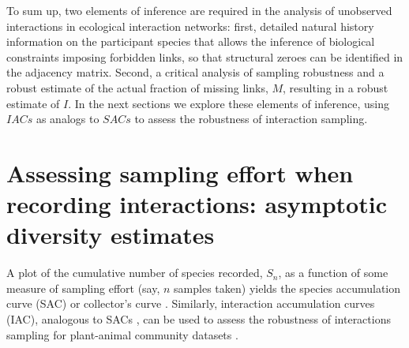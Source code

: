 \documentclass[12pt]{article}
\begin{document}

To sum up, two elements of inference are required in the analysis of unobserved interactions in ecological interaction networks: first, detailed natural history information on the participant species that allows the inference of biological constraints imposing forbidden links, so that structural zeroes can be identified in the adjacency matrix. Second, a critical analysis of sampling robustness and a robust estimate of the actual fraction of missing links, $M$, resulting in a robust estimate of $I$. In the next sections we explore these elements of inference, using $IACs$ as analogs to $SACs$ to assess the robustness of interaction sampling.

\section*{Assessing sampling effort when recording interactions: asymptotic diversity estimates}
\label{assessingsamplingeffortwhenrecordinginteractions}

A plot of the cumulative number of species recorded, $S_n$, as a function of some measure of sampling effort (say, $n$ samples taken) yields the species accumulation curve (SAC) or collector's curve \citep{Colwell:1994vt}. Similarly, interaction accumulation curves (IAC), analogous to SACs \citep{Gotelli:2001uo,Hortal:2006dc,Chao:2005wp,Colwell:2013kj}, can be used to assess the robustness of interactions sampling for plant-animal community datasets \citep{E31/2562,Jordano:2009c,Olesen:2011a}.
\end{document}
